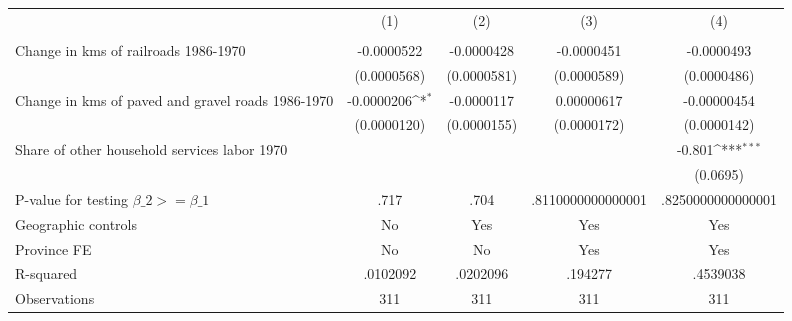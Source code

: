{
\def\sym#1{\ifmmode^{#1}\else\(^{#1}\)\fi}
\begin{tabular}{l*{4}{c}}
\hline\hline
                &\multicolumn{1}{c}{(1)}&\multicolumn{1}{c}{(2)}&\multicolumn{1}{c}{(3)}&\multicolumn{1}{c}{(4)}\\
                &\multicolumn{1}{c}{}&\multicolumn{1}{c}{}&\multicolumn{1}{c}{}&\multicolumn{1}{c}{}\\
\hline
Change in kms of railroads 1986-1970&-0.0000522         &-0.0000428         &-0.0000451         &-0.0000493         \\
                &(0.0000568)         &(0.0000581)         &(0.0000589)         &(0.0000486)         \\
[1em]
Change in kms of paved and gravel roads 1986-1970&-0.0000206\sym{*}  &-0.0000117         &0.00000617         &-0.00000454         \\
                &(0.0000120)         &(0.0000155)         &(0.0000172)         &(0.0000142)         \\
[1em]
Share of other household services labor 1970&                  &                  &                  &   -0.801\sym{***}\\
                &                  &                  &                  & (0.0695)         \\
\hline
P-value for testing $\beta\_{2} >= \beta\_{1}$&     .717         &     .704         &.8110000000000001         &.8250000000000001         \\
Geographic controls&       No         &      Yes         &      Yes         &      Yes         \\
Province FE     &       No         &       No         &      Yes         &      Yes         \\
R-squared       & .0102092         & .0202096         &  .194277         & .4539038         \\
Observations    &      311         &      311         &      311         &      311         \\
\hline\hline
\end{tabular}
}
